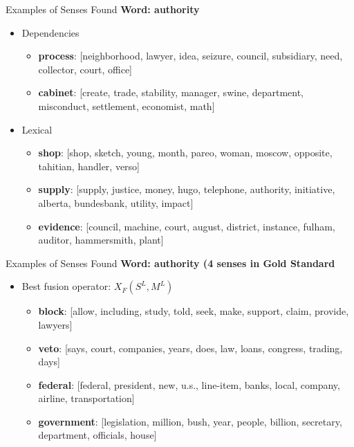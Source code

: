 \documentclass[10pt,=table]{beamer}
\newcommand\mlex{M^{\scriptscriptstyle L}}
\newcommand\slex{S^{\scriptscriptstyle L}}
\begin{document}
\begin{frame}{Examples of Senses Found }
\textbf{Word: authority}
\begin{itemize}
\item Dependencies
\begin{itemize}
	\item \textbf{process}: [neighborhood, lawyer, idea, seizure, council, subsidiary, need, collector, court, office]
	\item \textbf{cabinet}: [create, trade, stability, manager, swine, department, misconduct, settlement, economist, math] 
		
\end{itemize}
\item Lexical
\begin{itemize}
	\item \textbf{shop}: [shop, sketch, young, month, pareo, woman, moscow, opposite, tahitian, handler, verso]
	\item \textbf{supply}: [supply, justice, money, hugo, telephone, authority, initiative, alberta, bundesbank, utility, impact] 
	\item \textbf{evidence}: [council, machine, court, august, district, instance, fulham, auditor, hammersmith, plant]
		
\end{itemize}
\end{itemize}
\end{frame}

\begin{frame}{Examples of Senses Found}
\textbf{Word: authority (4 senses in Gold Standard}
\begin{itemize}
\item Best fusion operator: $X_F(\slex,\mlex)$
\begin{itemize}
	\item \textbf{block}: [allow, including, study, told,
	       seek, make, support, claim, provide, lawyers]
	\item \textbf{veto}: [says, court, companies, years, does, law,
	       loans, congress, trading, days]
	\item \textbf{federal}: [federal, president, new, u.s., line-item, banks, local, company, airline, transportation]
	\item \textbf{government}: [legislation, million,
	       bush, year, people, billion, secretary, department, officials, house]
		
\end{itemize}
\end{itemize}


\end{frame}
\end{document}
